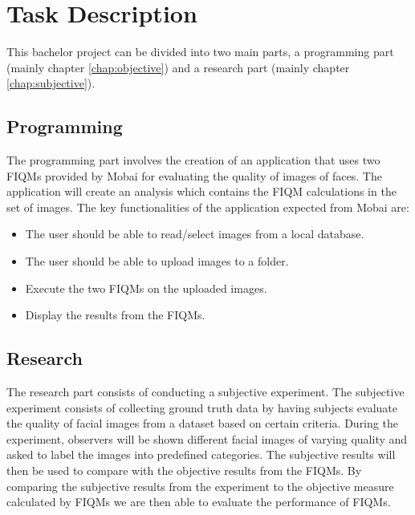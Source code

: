 \section{Task Description}
\label{sec:TaskD}
This bachelor project can be divided into two main parts, a programming part (mainly chapter \ref{chap:objective}) and a research part (mainly chapter \ref{chap:subjective}).

\subsection*{Programming}
The programming part involves the creation of an application that uses two FIQMs provided by Mobai for evaluating the quality of images of faces. The application will create an analysis which contains the FIQM calculations in the set of images. The key functionalities of the application expected from Mobai are: 
\begin{itemize}
    \item The user should be able to read/select images from a local database.
    \item The user should be able to upload images to a folder.
    \item Execute the two FIQMs on the uploaded images.
    \item Display the results from the FIQMs. 
\end{itemize}

\subsection*{Research}
The research part consists of conducting a subjective experiment. The subjective experiment consists of collecting ground truth data by having subjects evaluate the quality of facial images from a dataset based on certain criteria. During the experiment, observers will be shown different facial images of varying quality and asked to label the images into predefined categories. The subjective results will then be used to compare with the objective results from the FIQMs. By comparing the subjective results from the experiment to the objective measure calculated by FIQMs we are then able to evaluate the performance of FIQMs. 

